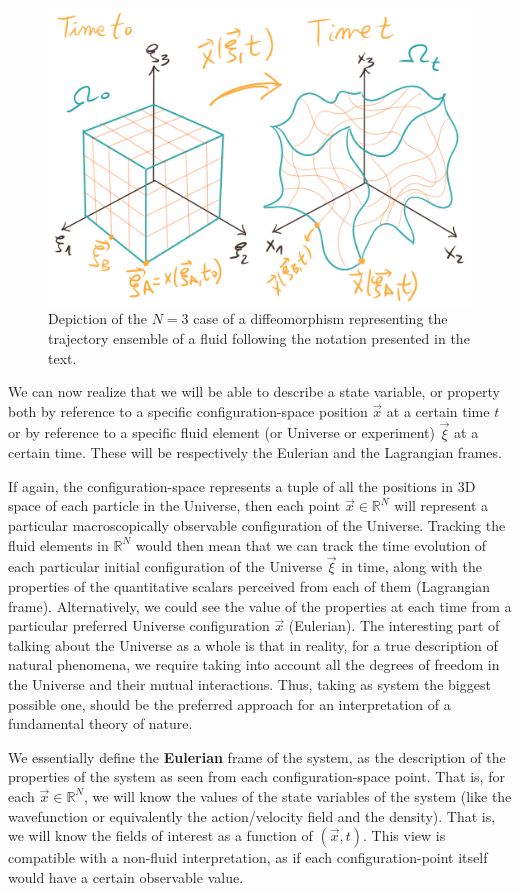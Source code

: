 \documentclass[11pt, a4paper]{article} %
\newcommand{\R}{\mathbb{R}} %
\begin{document}
\begin{figure}[h!]
  \centering
    \includegraphics[width=0.65\linewidth]{1deforma.png}
  \caption{Depiction of the $N=3$ case of a diffeomorphism representing the trajectory ensemble of a fluid following the notation presented in the text. }
  \label{fig:deform}
\end{figure}
\newpage
We can now realize that we will be able to describe a state variable, or property both by reference to a specific configuration-space position $\vec{x}$ at a certain time $t$ or by reference to a specific fluid element (or Universe or experiment) $\vec{\xi}$ at a certain time. These will be respectively the Eulerian and the Lagrangian frames. 

If again, the configuration-space represents a tuple of all the positions in 3D space of each particle in the Universe, then each point $\vec{x}\in \R^N$ will represent a particular macroscopically observable configuration of the Universe. Tracking the fluid elements in $\R^N$ would then mean that we can track the time evolution of each particular initial configuration of the Universe $\vec{\xi}$ in time, along with the properties of the quantitative scalars perceived from each of them (Lagrangian frame). Alternatively, we could see the value of the properties at each time from a particular preferred Universe configuration $\vec{x}$ (Eulerian). The interesting part of talking about the Universe as a whole is that in reality, for a true description of natural phenomena, we require taking into account all the degrees of freedom in the Universe and their mutual interactions. Thus, taking as system the biggest possible one, should be the preferred approach for an interpretation of a fundamental theory of nature. 

We essentially define the {\bf Eulerian} frame of the system, as the description of the properties of the system as seen from each configuration-space point. That is, for each $\vec{x}\in\R^N$, we will know the values of the state variables of the system (like the wavefunction or equivalently the action/velocity field and the density). That is, we will know the fields of interest as a function of $(\vec{x},t)$. This view is compatible with a non-fluid interpretation, as if each configuration-point itself would have a certain observable value. 
\end{document}
